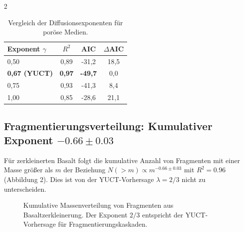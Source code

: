 \documentclass[11pt,a4paper]{article}
\begin{document}
\begin{multicols}{2}
		\begin{table}[htbp]
			\centering
			\caption{Vergleich der Diffusionsexponenten für poröse Medien.}
			\label{tab:diffusion}
			\begin{tabular}{lccc}
				\toprule
				Exponent $\gamma$ & $R^2$ & AIC & $\Delta$AIC \\
				\midrule
				0,50 & 0,89 & -31,2 & 18,5 \\
				\textbf{0,67 (YUCT)} & \textbf{0,97} & \textbf{-49,7} & 0,0 \\
				0,75 & 0,93 & -41,3 & 8,4 \\
				1,00 & 0,85 & -28,6 & 21,1 \\
				\bottomrule
			\end{tabular}
		\end{table}
		
		\subsection{Fragmentierungsverteilung: Kumulativer Exponent \(-0.66 \pm 0.03\)}
		
		Für zerkleinerten Basalt folgt die kumulative Anzahl von Fragmenten mit einer Masse größer als \(m\) der Beziehung \(N(>m) \propto m^{-0.66 \pm 0.03}\) mit \(R^2 = 0.96\) (Abbildung 2). Dies ist von der YUCT-Vorhersage \(\lambda = 2/3\) nicht zu unterscheiden.
		
		\begin{figure}[htbp]
			\centering
			\caption{Kumulative Massenverteilung von Fragmenten aus Basaltzerkleinerung. Der Exponent \(2/3\) entspricht der YUCT-Vorhersage für Fragmentierungskaskaden.}
			\label{fig:fragmentation}
		\end{figure}
		

\end{multicols}
\end{document}
